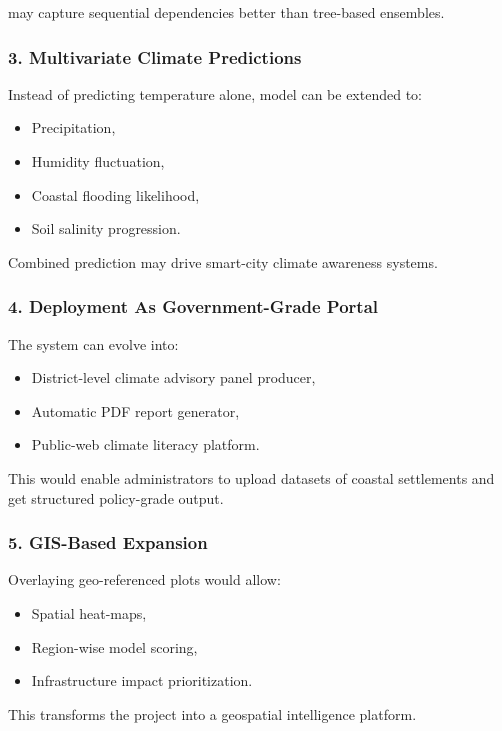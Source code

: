 \documentclass[12pt, a4paper]{article}
\begin{document}
may capture sequential dependencies better than tree-based ensembles.

\subsubsection*{3. Multivariate Climate Predictions}
Instead of predicting temperature alone, model can be extended to:

\begin{itemize}
    \item Precipitation,
    \item Humidity fluctuation,
    \item Coastal flooding likelihood,
    \item Soil salinity progression.
\end{itemize}

Combined prediction may drive smart-city climate awareness systems.

\subsubsection*{4. Deployment As Government-Grade Portal}
The system can evolve into:

\begin{itemize}
    \item District-level climate advisory panel producer,
    \item Automatic PDF report generator,
    \item Public-web climate literacy platform.
\end{itemize}

This would enable administrators to upload datasets of coastal settlements and get structured policy-grade output.

\subsubsection*{5. GIS-Based Expansion}
Overlaying geo-referenced plots would allow:

\begin{itemize}
    \item Spatial heat-maps,
    \item Region-wise model scoring,
    \item Infrastructure impact prioritization.
\end{itemize}

This transforms the project into a geospatial intelligence platform.
\end{document}
